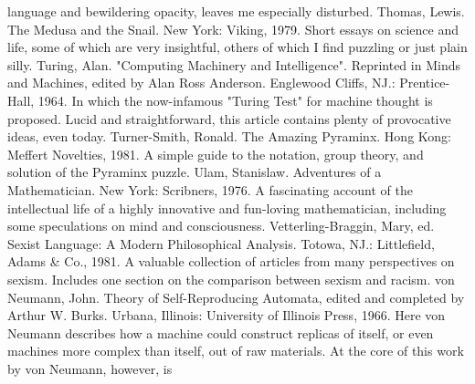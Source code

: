   language and bewildering opacity, leaves me especially disturbed.
Thomas, Lewis. The Medusa and the Snail. New York: Viking, 1979. Short essays on science
  and life, some of which are very insightful, others of which I find puzzling or just plain
  silly.
Turing, Alan. "Computing Machinery and Intelligence". Reprinted in Minds and Machines,
  edited by Alan Ross Anderson. Englewood Cliffs, NJ.: Prentice-Hall,
1964. In which the now-infamous "Turing Test" for machine thought is proposed. Lucid and
  straightforward, this article contains plenty of provocative ideas, even today.
Turner-Smith, Ronald. The Amazing Pyraminx. Hong Kong: Meffert Novelties, 1981. A
  simple guide to the notation, group theory, and solution of the Pyraminx puzzle.
Ulam, Stanislaw. Adventures of a Mathematician. New York: Scribners, 1976. A fascinating
  account of the intellectual life of a highly innovative and fun-loving mathematician,
  including some speculations on mind and consciousness.
Vetterling-Braggin, Mary, ed. Sexist Language: A Modern Philosophical Analysis. Totowa,
  NJ.: Littlefield, Adams \& Co., 1981. A valuable collection of articles from many
  perspectives on sexism. Includes one section on the comparison between sexism and
  racism.
von Neumann, John. Theory of Self-Reproducing Automata, edited and completed by
  Arthur W. Burks. Urbana, Illinois: University of Illinois Press, 1966. Here von Neumann
  describes how a machine could construct replicas of itself, or even machines more complex
  than itself, out of raw materials. At the core of this work by von Neumann, however, is



